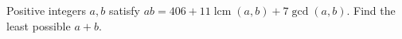 Positive integers $a,b$ satisfy $ab=406+11\operatorname{lcm}(a,b)+7\gcd(a,b)$. Find the least possible $a+b$.
